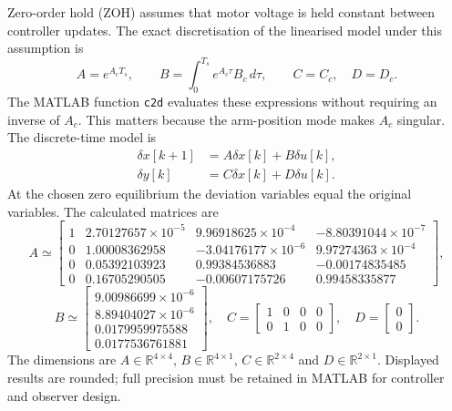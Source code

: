 Zero-order hold (ZOH) assumes that motor voltage is held constant between
controller updates. The exact discretisation of the linearised model
under this assumption is
\begin{equation}\label{eq:zoh}
A=e^{A_cT_s},\qquad
B=\int_0^{T_s}e^{A_c\tau}B_c\,d\tau,\qquad C=C_c,\quad D=D_c.
\end{equation}
The MATLAB function \texttt{c2d} evaluates these expressions without
requiring an inverse of $A_c$. This matters because the arm-position mode
makes $A_c$ singular.
The discrete-time model is
\begin{subequations}\label{eq:dt_ss}
\begin{align}
\delta x[k+1]&=A\delta x[k]+B\delta u[k],\\
\delta y[k]&=C\delta x[k]+D\delta u[k].
\end{align}
\end{subequations}
At the chosen zero equilibrium the deviation variables equal the
original variables. The calculated matrices are
\begin{equation}\label{eq:A_discrete}
A\simeq
\begin{bmatrix}
1&2.70127657\!\times\!10^{-5}&9.96918625\!\times\!10^{-4}&-8.80391044\!\times\!10^{-7}\\
0&1.00008362958&-3.04176177\!\times\!10^{-6}&9.97274363\!\times\!10^{-4}\\
0&0.05392103923&0.99384536883&-0.00174835485\\
0&0.16705290505&-0.00607175726&0.99458335877
\end{bmatrix},
\end{equation}
\begin{equation}
B\simeq\begin{bmatrix}
9.00986699\times10^{-6}\\8.89404027\times10^{-6}\\
0.0179959975588\\0.0177536761881
\end{bmatrix},\quad
C=\begin{bmatrix}1&0&0&0\\0&1&0&0\end{bmatrix},\quad
D=\begin{bmatrix}0\\0\end{bmatrix}.
\end{equation}
The dimensions are $A\in\mathbb R^{4\times4}$,
$B\in\mathbb R^{4\times1}$, $C\in\mathbb R^{2\times4}$ and
$D\in\mathbb R^{2\times1}$. Displayed results are rounded;
full precision must be retained in MATLAB for controller and observer
design.

